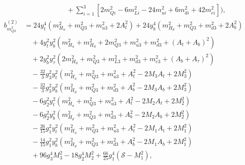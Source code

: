 \documentclass[preprint,amsmath,amssymb,aps,superscriptaddress,prd,showpacs,floatfix]{revtex4-1}
\begin{document}
\begin{subequations}
\begin{align}
&\qquad\qquad\qquad{}+\sum_{i=1}^3\left [ 2m_{Qi}^2-6m_{Li}^2-24m_{ui}^2+6m_{di}^2+42m_{ei}^2\right ]\bigg ),\label{eq:MSSMmQ32beta2}\\
b_{m_{Q3}^2}^{(2)}&=24y_t^4\left ( m_{H_u}^2+m_{Q3}^2+m_{u3}^2+2A_t^2\right )+24y_b^4\left ( m_{H_d}^2+m_{Q3}^2+m_{d3}^2+2A_b^2\right )\nonumber\\
&\quad{}+4y_t^2y_b^2\left ( m_{H_u}^2+m_{H_d}^2+2m_{Q3}^2+m_{u3}^2+m_{d3}^2+(A_t+A_b)^2\right )\nonumber\\
&\quad{}+2y_b^2y_\tau^2\left ( 2m_{H_d}^2+m_{Q3}^2+m_{L3}^2+m_{d3}^2+m_{e3}^2+(A_b+A_\tau)^2\right )\nonumber\\
&\quad{}-\frac{32}{3}g_3^2y_t^2\left ( m_{H_u}^2+m_{Q3}^2+m_{u3}^2+A_t^2-2M_3A_t+2M_3^2\right )\nonumber\\
&\quad{}-\frac{32}{3}g_3^2y_b^2\left ( m_{H_d}^2+m_{Q3}^2+m_{d3}^2+A_b^2-2M_3A_b+2M_3^2\right )\nonumber\\
&\quad{}-6g_2^2y_t^2\left ( m_{H_u}^2+m_{Q3}^2+m_{u3}^2+A_t^2-2M_2A_t+2M_2^2\right )\nonumber\\
&\quad{}-6g_2^2y_b^2\left ( m_{H_d}^2+m_{Q3}^2+m_{d3}^2+A_b^2-2M_2A_b+2M_2^2\right )\nonumber\\
&\quad{}-\frac{26}{15}g_1^2y_t^2\left ( m_{H_u}^2+m_{Q3}^2+m_{u3}^2+A_t^2-2M_1A_t+2M_1^2\right )\nonumber\\
&\quad{}-\frac{14}{15}g_1^2y_b^2\left ( m_{H_d}^2+m_{Q3}^2+m_{d3}^2+A_b^2-2M_1A_b+2M_1^2\right )\nonumber\\
&\quad{}+96g_3^4M_3^2-18g_2^4M_2^2+\frac{66}{25}g_1^4(\mathcal{S}-M_1^2),\label{eq:MSSMmQ32b2}
\end{align}
\end{subequations}
\end{document}
